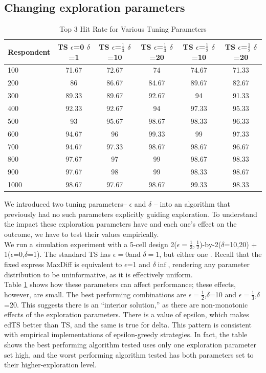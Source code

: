 \documentclass[nonblindrev]{informs3}
\begin{document}
\subsection{Changing exploration parameters}
\begin{table}
\begin{center}
\begin{tabular}{l | c | c | c | c | c }
 Respondent& TS $\epsilon$=0 $\delta$=1&  TS $\epsilon$=$\frac{1}{3}$ $\delta$=10  &TS $\epsilon$=$\frac{1}{3}$ $\delta$=20 & TS $\epsilon$=$\frac{1}{2}$ $\delta$=10 &TS $\epsilon$=$\frac{1}{2}$ $\delta$=20  \\
\hline
100	&	71.67	&	72.67	&	74	&	74.67	&	71.33	\\
200	&	86	&	86.67	&	84.67	&	89.67	&	82.67	\\
300	&	89.33	&	89.67	&	92.67	&	94	&	91.33	\\
400	&	92.33	&	92.67	&	94	&	97.33	&	95.33	\\
500	&	93	&	95.67	&	98.67	&	98.33	&	96.33	\\
600	&	94.67	&	96	&	99.33	&	99	&	97.33	\\
700	&	94.67	&	97.33	&	98.67	&	98.67	&	96.67	\\
800	&	97.67	&	97	&	99	&	98.67	&	98.33	\\
900	&	97.67	&	98	&	99	&	98.33	&	98.67	\\
1000	&	98.67	&	97.67	&	98.67	&	99.33	&	98.33	\\
\hline
\end{tabular}
\end{center}
\caption{Top 3 Hit Rate for Various Tuning Parameters}
\label{table:EDTS}
\end{table}
We introduced two tuning parameters– $\epsilon$ and $\delta$ –  into an algorithm that previously had no such parameters explicitly guiding exploration. To understand the impact these exploration parameters have and each one's effect on the outcome, we have to test their values empirically. \\
We run a simulation experiment with a 5-cell design 2($\epsilon=\frac{1}{3}, \frac{1}{2}$)-by-2($\delta$=10,20) + 1($\epsilon$=0,$\delta$=1).  The standard TS has $\epsilon=0$and $\delta=1$, but either one . Recall that the fixed express MaxDiff is equivalent to $\epsilon$=1 and $\delta\inf$, rendering any parameter distribution to be uninformative, as it is effectively uniform.\\
Table \ref{table:EDTS} shows how these parameters can affect performance; these effects, however, are small. The best performing combinations are $\epsilon=\frac{1}{2}$,$\delta$=10 and $\epsilon=\frac{1}{3}$,$\delta$=20. This suggests there is an ``interior solution,'' as there are non-monotonic effects of the exploration parameters. There is a value of epsilon, which makes edTS better than TS, and the same is true for delta. This pattern is consistent with empirical implementations of epsilon-greedy strategies. In fact, the table shows the best performing algorithm tested uses only one exploration parameter set high, and the worst performing algorithm tested has both parameters set to their higher-exploration level.\\
\end{document}
